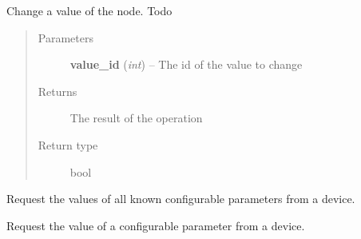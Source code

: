 \documentclass[letterpaper,10pt,english]{sphinxmanual}
\begin{document}
\begin{fulllineitems}
\begin{fulllineitems}
\begin{quote}
\begin{description}
\end{description}\end{quote}

\end{fulllineitems}


\begin{fulllineitems}
\label{node:openzwave.node.ZWaveNode.remove_value}
Change a value of the node. Todo
\begin{quote}\begin{description}
\item[{Parameters}] \leavevmode
\textbf{value\_id} (\emph{int}) -- The id of the value to change

\item[{Returns}] \leavevmode
The result of the operation

\item[{Return type}] \leavevmode
bool

\end{description}\end{quote}

\end{fulllineitems}


\begin{fulllineitems}
\label{node:openzwave.node.ZWaveNode.request_all_config_params}
Request the values of all known configurable parameters from a device.

\end{fulllineitems}


\begin{fulllineitems}
\label{node:openzwave.node.ZWaveNode.request_config_param}
Request the value of a configurable parameter from a device.


\end{fulllineitems}
\end{fulllineitems}
\end{document}
